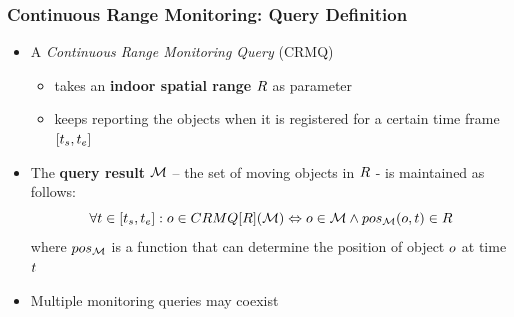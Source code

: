 \begin{frame}
\end{frame}


\begin{frame}
\frametitle{Continuous Range Monitoring: Query Definition}

\begin{itemize}
  \item A \emph{Continuous Range Monitoring Query} (CRMQ)
    \begin{itemize}
      \item takes an \textbf{indoor spatial range} $\bf \mathnormal{R}$ as parameter
      \item keeps reporting the objects when it is registered for a certain time frame $\mathnormal{[t_s, t_e]}$
    \end{itemize}
  \item The \textbf{query result} $\bf \mathcal{M}$ -- the set of moving objects in $\bf \mathnormal{R}$ - is maintained as follows:
    \begin{equation*}
      \mathnormal{
      \forall t \in [t_s, t_e]: o \in CRMQ[R](\mathcal{M})  \Leftrightarrow o \in \mathcal{M} \wedge pos_{\mathcal{M}}(o, t) \in R
      }
    \end{equation*}
    where $\mathnormal{pos_\mathcal{M}}$ is a function that can determine the position of object $\mathnormal{o}$ at time $\mathnormal{t}$
  \item Multiple monitoring queries may coexist
\end{itemize}

\end{frame}


